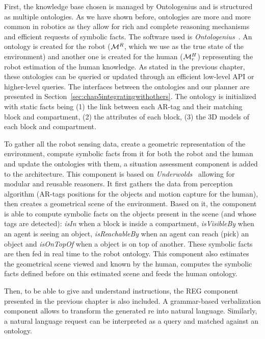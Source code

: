 \documentclass[a4paper,11pt,twoside]{StyleThese}
\begin{document}
First, the knowledge base chosen is managed by Ontologenius and is structured as multiple ontologies. As we have shown before, ontologies are more and more common in robotics as they allow for rich and complete reasoning mechanisms and efficient requests of symbolic facts. The software used is \textit{Ontologenius}~\cite{sarthou2019ontologenius}. An ontology is created for the robot ($\mathcal{M}^R$, which we use as the true state of the environment) and another one is created for the human ($\mathcal{M}^H_r$) representing the robot estimation of the human knowledge. As stated in the previous chapter, these ontologies can be queried or updated through an efficient low-level API or higher-level \sparql{} queries. The interfaces between the ontologies and our planner are presented in Section~\ref{sec:chap5integratingwithothers}. The ontology is initialized with static facts being (1) the link between each AR-tag and their matching block and compartment, (2) the attributes of each block, (3) the 3D models of each block and compartment.

To gather all the robot sensing data, create a geometric representation of the environment, compute symbolic facts from it for both the robot and the human and update the ontologies with them, a situation assessment component is added to the architecture. This component is based on \textit{Underwolds}~\cite{lemaignan2018underworlds} allowing for modular and reusable reasoners. It first gathers the data from perception algorithm (AR-tags positions for the objects and motion capture for the human), then creates a geometrical scene of the environment. Based on it, the component is able to compute symbolic facts on the objects present in the scene (and whose tags are detected): \textit{isIn} when a block is inside a compartment, \textit{isVisibleBy} when an agent is seeing an object, \textit{isReachableBy} when an agent can reach (pick) an object and \textit{isOnTopOf} when a object is on top of another. These symbolic facts are then fed in real time to the robot ontology. This component also estimates the geometrical scene viewed and known by the human, computes the symbolic facts defined before on this estimated scene and feeds the human ontology.

Then, to be able to give and understand instructions, the REG component presented in the previous chapter is also included. A grammar-based verbalization component allows to transform the generated \acrshort{re} into natural language. Similarly, a natural language request can be interpreted as a \sparql{} query and matched against an ontology.
\end{document}
